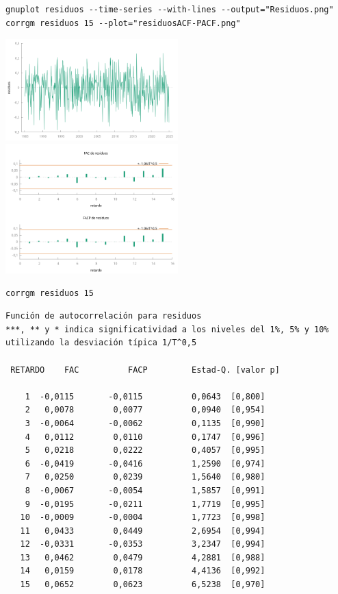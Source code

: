 \documentclass[10pt]{article}
\begin{document}
\begin{verbatim}
gnuplot residuos --time-series --with-lines --output="Residuos.png"
corrgm residuos 15 --plot="residuosACF-PACF.png"
\end{verbatim}

\begin{center}
\includegraphics[width=0.5\textwidth]{./EjercicioIdentificacionARIMA/Residuos.png}
\includegraphics[width=0.5\textwidth]{./EjercicioIdentificacionARIMA/residuosACF-PACF.png}
\end{center}

\begin{verbatim}
corrgm residuos 15
\end{verbatim}


\begin{verbatim}
Función de autocorrelación para residuos
***, ** y * indica significatividad a los niveles del 1%, 5% y 10%
utilizando la desviación típica 1/T^0,5

 RETARDO    FAC          FACP         Estad-Q. [valor p]

    1  -0,0115       -0,0115          0,0643  [0,800]
    2   0,0078        0,0077          0,0940  [0,954]
    3  -0,0064       -0,0062          0,1135  [0,990]
    4   0,0112        0,0110          0,1747  [0,996]
    5   0,0218        0,0222          0,4057  [0,995]
    6  -0,0419       -0,0416          1,2590  [0,974]
    7   0,0250        0,0239          1,5640  [0,980]
    8  -0,0067       -0,0054          1,5857  [0,991]
    9  -0,0195       -0,0211          1,7719  [0,995]
   10  -0,0009       -0,0004          1,7723  [0,998]
   11   0,0433        0,0449          2,6954  [0,994]
   12  -0,0331       -0,0353          3,2347  [0,994]
   13   0,0462        0,0479          4,2881  [0,988]
   14   0,0159        0,0178          4,4136  [0,992]
   15   0,0652        0,0623          6,5238  [0,970]
\end{verbatim}
\end{document}
